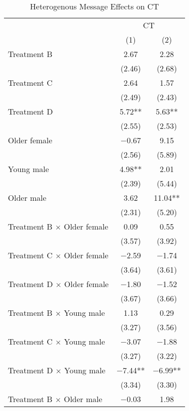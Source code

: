 \documentclass[12pt, a4paper]{article}
\begin{document}
\begin{table}[H]

\caption{\label{tab:test-lm-interaction-reg}Heterogenous Message Effects on CT}
\centering
\fontsize{8}{10}\selectfont
\begin{threeparttable}
\begin{tabular}[t]{lcc}
\toprule
\multicolumn{1}{c}{ } & \multicolumn{2}{c}{CT} \\
\cmidrule(l{3pt}r{3pt}){2-3}
  & (1) & (2)\\
\midrule
Treatment B & \num{2.67} & \num{2.28}\\
 & (\num{2.46}) & (\num{2.68})\\
Treatment C & \num{2.64} & \num{1.57}\\
 & (\num{2.49}) & (\num{2.43})\\
Treatment D & \num{5.72}** & \num{5.63}**\\
 & (\num{2.55}) & (\num{2.53})\\
Older female & \num{-0.67} & \num{9.15}\\
 & (\num{2.56}) & (\num{5.89})\\
Young male & \num{4.98}** & \num{2.01}\\
 & (\num{2.39}) & (\num{5.44})\\
Older male & \num{3.62} & \num{11.04}**\\
 & (\num{2.31}) & (\num{5.20})\\
Treatment B $\times$ Older female & \num{0.09} & \num{0.55}\\
 & (\num{3.57}) & (\num{3.92})\\
Treatment C $\times$ Older female & \num{-2.59} & \num{-1.74}\\
 & (\num{3.64}) & (\num{3.61})\\
Treatment D $\times$ Older female & \num{-1.80} & \num{-1.52}\\
 & (\num{3.67}) & (\num{3.66})\\
Treatment B $\times$ Young male & \num{1.13} & \num{0.29}\\
 & (\num{3.27}) & (\num{3.56})\\
Treatment C $\times$ Young male & \num{-3.07} & \num{-1.88}\\
 & (\num{3.27}) & (\num{3.22})\\
Treatment D $\times$ Young male & \num{-7.44}** & \num{-6.99}**\\
 & (\num{3.34}) & (\num{3.30})\\
Treatment B $\times$ Older male & \num{-0.03} & \num{1.98}\\

\end{tabular}
\end{threeparttable}
\end{table}
\end{document}

